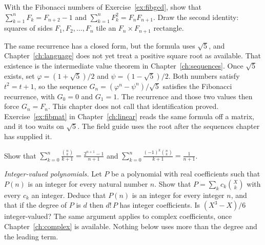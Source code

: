 \begin{exercise}[$\star\star$]\label{ex:fibsums}
With the Fibonacci numbers of Exercise~\ref{ex:fibgcd}, show that $\sum_{k=1}^n F_k=F_{n+2}-1$ and $\sum_{k=1}^n F_k^2=F_n F_{n+1}$. Draw the second identity: squares of sides $F_1,F_2,\dots,F_n$ tile an $F_n\times F_{n+1}$ rectangle.
\end{exercise}

\begin{remark}
The same recurrence has a closed form, but the formula uses $\sqrt5$, and Chapter~\ref{ch:language} does not yet treat a positive square root as available. That existence is the intermediate value theorem in Chapter~\ref{ch:sequences}. Once $\sqrt5$ exists, set $\varphi=(1+\sqrt5)/2$ and $\psi=(1-\sqrt5)/2$. Both numbers satisfy $t^2=t+1$, so the sequence $G_n=(\varphi^n-\psi^n)/\sqrt5$ satisfies the Fibonacci recurrence, with $G_0=0$ and $G_1=1$. The recurrence and those two values then force $G_n=F_n$. This chapter does not call that identification proved. Exercise~\ref{ex:fibmat} in Chapter~\ref{ch:linear} reads the same formula off a matrix, and it too waits on $\sqrt5$. The field guide uses the root after the sequences chapter has supplied it.
\end{remark}

\begin{exercise}[$\star\star$]\label{ex:binomfrac}
Show that $\displaystyle\sum_{k=0}^n\frac{\binom nk}{k+1}=\frac{2^{n+1}-1}{n+1}$ and $\displaystyle\sum_{k=0}^n\frac{(-1)^k\binom nk}{k+1}=\frac{1}{n+1}$.
\end{exercise}

\begin{exercise}[$\star\star$]\label{ex:intpoly}
\emph{Integer-valued polynomials.} Let $P$ be a polynomial with real coefficients such that $P(n)$ is an integer for every natural number $n$. Show that $P=\sum_k c_k\binom Xk$ with every $c_k$ an integer. Deduce that $P(n)$ is an integer for every integer $n$, and that if the degree of $P$ is $d$ then $d!\,P$ has integer coefficients. Is $(X^3-X)/6$ integer-valued? The same argument applies to complex coefficients, once Chapter~\ref{ch:complex} is available. Nothing below uses more than the degree and the leading term.
\end{exercise}

